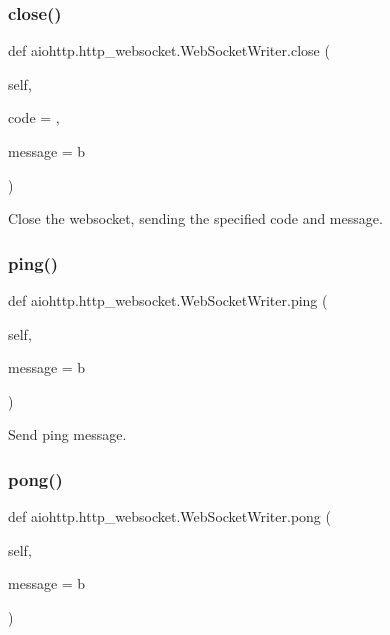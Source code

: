 \subsubsection{\texorpdfstring{close()}{close()}}
{\footnotesize\ttfamily def aiohttp.\+http\+\_\+websocket.\+Web\+Socket\+Writer.\+close (\begin{DoxyParamCaption}\item[{}]{self,  }\item[{}]{code = {},  }\item[{}]{message = {\ttfamily b\textquotesingle{}\textquotesingle{}} }\end{DoxyParamCaption})}

\begin{DoxyVerb}Close the websocket, sending the specified code and message.\end{DoxyVerb}
 \mbox{\label{classaiohttp_1_1http__websocket_1_1_web_socket_writer_ae280b448c45b713bf19d917f31b5796e}} 
\subsubsection{\texorpdfstring{ping()}{ping()}}
{\footnotesize\ttfamily def aiohttp.\+http\+\_\+websocket.\+Web\+Socket\+Writer.\+ping (\begin{DoxyParamCaption}\item[{}]{self,  }\item[{}]{message = {\ttfamily b\textquotesingle{}\textquotesingle{}} }\end{DoxyParamCaption})}

\begin{DoxyVerb}Send ping message.\end{DoxyVerb}
 \mbox{\label{classaiohttp_1_1http__websocket_1_1_web_socket_writer_adc15b9ddd24ca2eaf24ee1873233ac8c}} 
\subsubsection{\texorpdfstring{pong()}{pong()}}
{\footnotesize\ttfamily def aiohttp.\+http\+\_\+websocket.\+Web\+Socket\+Writer.\+pong (\begin{DoxyParamCaption}\item[{}]{self,  }\item[{}]{message = {\ttfamily b\textquotesingle{}\textquotesingle{}} }\end{DoxyParamCaption})}

